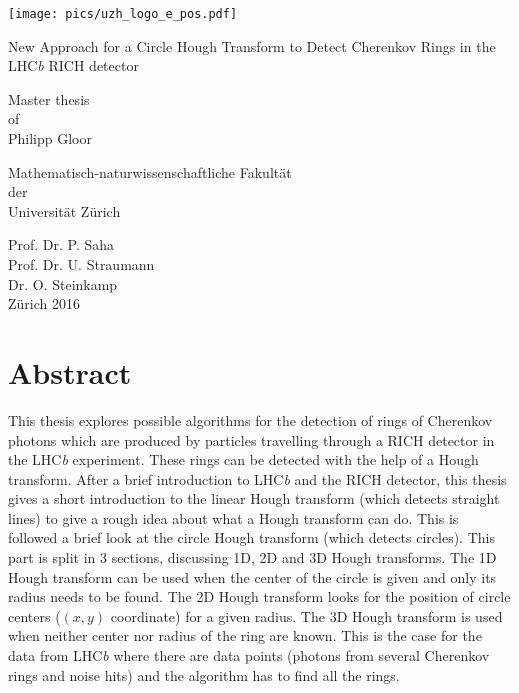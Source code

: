 \documentclass[11pt]{scrreprt}
\begin{document}
\begin{titlepage}
  \texttt{[image: pics/uzh\_logo\_e\_pos.pdf]}
  \vspace{1cm}

  \Huge\centering New Approach for a Circle Hough Transform to Detect
        Cherenkov Rings in the LHC\textit{b} RICH detector 

  \noindent\makebox[\textwidth]{\rule{\textwidth}{0.4pt}}

\vspace{1cm}

{\centering
  \Large Master thesis\\
  of\\
  Philipp Gloor
  \vspace{1.5cm}

  \Large Mathematisch-naturwissenschaftliche Fakultät\\
  der\\
  Universität Zürich
  \vspace{2cm}

  \Large 
  Prof. Dr. P. Saha\\
  Prof. Dr. U. Straumann\\
  Dr. O. Steinkamp\\
\vspace*{\fill}
\Large Zürich 2016


  }
\end{titlepage}
\chapter*{Abstract}
This thesis explores possible algorithms for the detection of rings of Cherenkov photons which are produced by particles 
travelling through a RICH detector in the LHC\textit{b} experiment. These rings can be detected with the help of a Hough 
transform. After a brief introduction to LHC\textit{b} and the RICH detector, this thesis gives a short introduction to 
the linear Hough transform (which detects straight lines) to give a rough idea about what a Hough transform can do. 
This is followed a brief look at the circle Hough transform (which detects circles). This part is split in 3 sections, 
discussing 1D, 2D and 3D Hough transforms. The 1D Hough transform can be used when the center of the circle is given and only its radius 
needs to be found. The 2D Hough transform looks for the position of circle centers ($(x,y)$ coordinate) for a given radius. 
The 3D Hough transform is used when neither center nor radius of the ring are known. This is the case for the data from LHC\textit{b} 
where there are data points (photons from several Cherenkov rings and noise hits) and the algorithm has to find all the rings.
\end{document}
